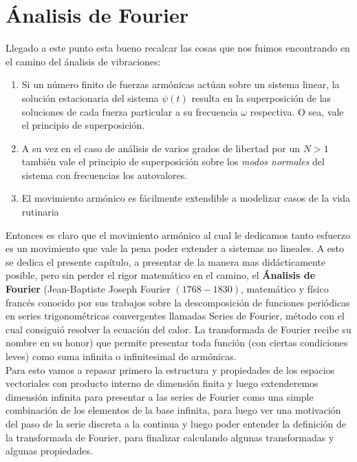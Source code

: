 \documentclass[a4paper,spanish]{article}
\numberwithin{equation}{section}
\begin{document}
\part{\'Analisis de Fourier}

Llegado a este punto esta bueno recalcar las cosas que nos fuimos encontrando en el camino del \'analisis de vibraciones:

\begin{enumerate}
\item Si un n\'umero finito de fuerzas arm\'onicas actúan sobre un sistema linear, la soluci\'on estacionaria del sistema $\psi \left({t}\right)$ resulta en la superposici\'on de las soluciones de cada fuerza particular a su frecuencia $\omega$ respectiva. O sea, vale el principio de superposici\'on.
\item A su vez en el caso de an\'alisis de varios grados de libertad por un $N>1$ tambi\'en vale el principio de superposici\'on sobre los \textit{modos normales} del sistema con frecuencias los autovalores.
\item El movimiento arm\'onico es f\'acilmente extendible a modelizar casos de la vida rutinaria 
\end{enumerate} 

Entonces es claro que el movimiento arm\'onico al cual le dedicamos tanto esfuerzo es un movimiento que vale la pena poder extender a sistemas no lineales. A esto se dedica el presente cap\'itulo, a presentar de la manera mas did\'acticamente posible, pero sin perder el rigor matem\'atico en el camino, el \textbf{\'Analisis de Fourier} (Jean-Baptiste Joseph Fourier $(1768-1830)$, matem\'atico y f\'isico franc\'es conocido por sus trabajos sobre la descomposici\'on de funciones peri\'odicas en series trigonom\'etricas convergentes llamadas Series de Fourier, m\'etodo con el cual consigui\'o resolver la ecuaci\'on del calor. La transformada de Fourier recibe su nombre en su honor) que permite presentar toda funci\'on (con ciertas condiciones leves) como suma infinita o infinitesimal de arm\'onicas. \\
Para esto vamos a repasar primero la estructura y propiedades de los espacios vectoriales con producto interno de dimensi\'on finita y luego extenderemos dimensi\'on infinita para presentar a las series de Fourier como una simple combinaci\'on de los elementos de la base infinita, para luego ver una motivaci\'on del paso de la serie discreta a la continua y luego poder entender la definici\'on de la transformada de Fourier, para finalizar calculando algunas transformadas y algunas propiedades.
\end{document}
